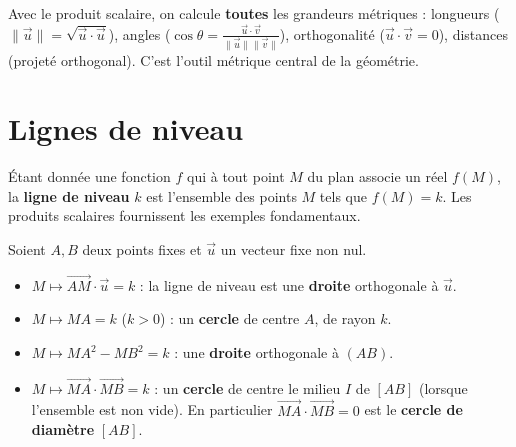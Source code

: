 \begin{aretenir}
Avec le produit scalaire, on calcule \textbf{toutes} les grandeurs métriques :
longueurs ($\|\vec u\|=\sqrt{\vec u\cdot\vec u}$), angles ($\cos\theta=\frac{\vec u\cdot\vec v}{\|\vec u\|\|\vec v\|}$),
orthogonalité ($\vec u\cdot\vec v=0$), distances (projeté orthogonal). C'est l'outil
métrique central de la géométrie.
\end{aretenir}

\section{Lignes de niveau}

\begin{definition}
Étant donnée une fonction $f$ qui à tout point $M$ du plan associe un réel $f(M)$,
la \textbf{ligne de niveau} $k$ est l'ensemble des points $M$ tels que $f(M)=k$.
Les produits scalaires fournissent les exemples fondamentaux.
\end{definition}

\begin{theoreme}
Soient $A,B$ deux points fixes et $\vec u$ un vecteur fixe non nul.
\begin{itemize}
\item \textbf{$M\mapsto\overrightarrow{AM}\cdot\vec u=k$} : la ligne de niveau est une \textbf{droite}
orthogonale à $\vec u$.
\item \textbf{$M\mapsto MA=k$} ($k>0$) : un \textbf{cercle} de centre $A$, de rayon $k$.
\item \textbf{$M\mapsto MA^{2}-MB^{2}=k$} : une \textbf{droite} orthogonale à $(AB)$.
\item \textbf{$M\mapsto\overrightarrow{MA}\cdot\overrightarrow{MB}=k$} : un \textbf{cercle}
de centre le milieu $I$ de $[AB]$ (lorsque l'ensemble est non vide). En particulier
$\overrightarrow{MA}\cdot\overrightarrow{MB}=0$ est le \textbf{cercle de diamètre} $[AB]$.
\end{itemize}
\end{theoreme}

